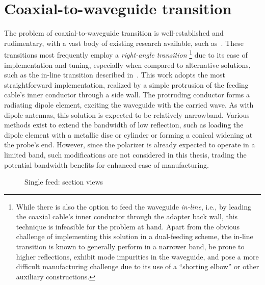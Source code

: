 \documentclass[11pt,a4paper,twoside,openany]{report}
\newlength{\twosubht}
\begin{document}
\section{Coaxial-to-waveguide transition}
\label{section:coaxial-to-waveguide-transition}
The problem of coaxial-to-waveguide transition is well-established and rudimentary, with a vast body of existing research available, such as~\parencite{fabregas-et-al:coaxial-to-rectangular-waveguide-transitions}. These transitions most frequently employ a \emph{right-angle transition}%
    \footnote{While there is also the option to feed the waveguide \emph{in-line}, i.e., by leading the coaxial cable's inner conductor through the adapter back wall, this technique is infeasible for the problem at hand. Apart from the obvious challenge of implementing this solution in a dual-feeding scheme, the in-line transition is known to generally perform in a narrower band, be prone to higher reflections, exhibit mode impurities in the waveguide, and pose a more difficult manufacturing challenge due to its use of a \enquote{shorting elbow} or other auxiliary constructions.}
due to its ease of implementation and tuning, especially when compared to alternative solutions, such as the in-line transition described in~\parencite{durga-et-al:millimiter-wave-inline-coaxial-to-rectangular-waveguide-transition}. This work adopts the most straightforward implementation, realized by a simple protrusion of the feeding cable's inner conductor through a side wall. The protruding conductor forms a radiating dipole element, exciting the waveguide with the carried wave. As with dipole antennas, this solution is expected to be relatively narrowband. Various methods exist to extend the bandwidth of low reflection, such as loading the dipole element with a metallic disc or cylinder or forming a conical widening at the probe's end. However, since the polarizer is already expected to operate in a limited band, such modifications are not considered in this thesis, trading the potential bandwidth benefits for enhanced ease of manufacturing.

\begin{figure}[!ht]
    \sbox{}
    \setlength{\twosubht}{\ht\twosubbox}

    \centering
    \quad
    \caption{\label{fig:single-feed-model}Single feed: section views}
\end{figure}
\end{document}
